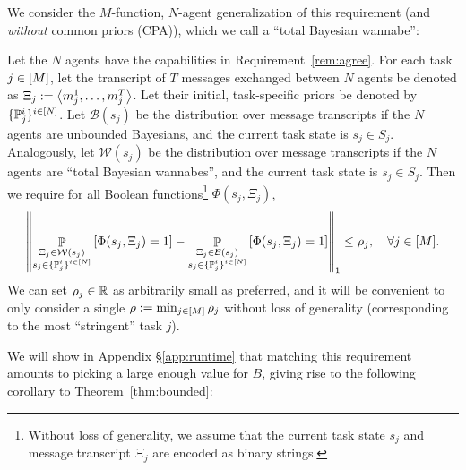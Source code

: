 We consider the $M$-function, $N$-agent generalization of this requirement (and \emph{without} common priors (CPA)), which we call a ``total Bayesian wannabe'':
\begin{definition}\label{def:total-wannabe}
Let the $N$ agents have the capabilities in Requirement~\ref{rem:agree}.
For each task $j \in [M]$, let the transcript of $T$ messages exchanged between $N$ agents be denoted as $\Xi_j := \left \langle m_j^1,\dots,m_j^T \right \rangle $.
Let their initial, task-specific priors be denoted by $\{\mathbb{P}_j^i\}^{i \in [N]}$.
Let $\mathcal{B}(s_j)$ be the distribution over message transcripts if the $N$ agents are unbounded Bayesians, and the current task state is $s_j \in S_j$.
Analogously, let $\mathcal{W}(s_j)$ be the distribution over message transcripts if the $N$ agents are ``total Bayesian wannabes'', and the current task state is $s_j \in S_j$.
Then we require for all Boolean functions\footnote{Without loss of generality, we assume that the current task state $s_j$ and message transcript $\Xi_j$ are encoded as binary strings.} $\Phi(s_j,\Xi_j)$,
\begin{equation*}
\left\|\mathop{\mathbb{P}}_{\substack{\Xi_j \in \mathcal{W}(s_j) \\ s_j \in \{\mathbb{P}_j^i\}^{i \in [N]}}}\left[\Phi(s_j, \Xi_j) = 1\right] 
- \mathop{\mathbb{P}}_{\substack{\Xi_j \in \mathcal{B}(s_j) \\ s_j \in \{\mathbb{P}_j^i\}^{i \in [N]}}}\left[\Phi(s_j, \Xi_j) = 1\right]\right\|_1 \le \rho_j, \quad \forall j \in [M].
\end{equation*}
We can set $\rho_j \in \mathbb{R}$ as arbitrarily small as preferred, and it will be convenient to only consider a single $\rho := \min_{j \in [M]} \rho_j$ without loss of generality (corresponding to the most ``stringent'' task $j$).
\end{definition}
We will show in Appendix \S\ref{app:runtime} that matching this requirement amounts to picking a large enough value for $B$, giving rise to the following corollary to Theorem~\ref{thm:bounded}:
